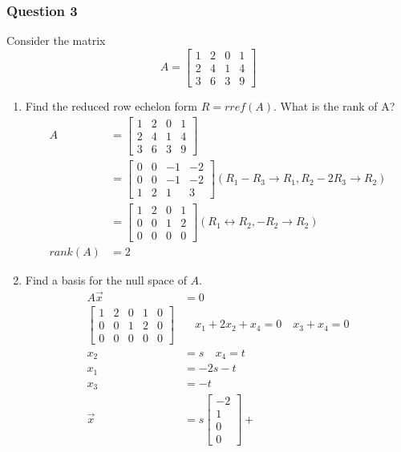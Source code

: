\documentclass{math}
\begin{document}
\subsubsection*{Question 3}
Consider the matrix
\[ A = \begin{bmatrix}
  1 & 2 & 0 & 1 \\
  2 & 4 & 1 & 4 \\
  3 & 6 & 3 & 9
\end{bmatrix} \]
\begin{enumerate}
  \item Find the reduced row echelon form \( R = rref(A) \). What is the rank
    of A?
  \begin{align*}
    A &= \begin{bmatrix}
      1 & 2 & 0 & 1 \\
      2 & 4 & 1 & 4 \\
      3 & 6 & 3 & 9
    \end{bmatrix} \\
    &= \begin{bmatrix}
      0 & 0 & -1 & -2 \\
      0 & 0 & -1 & -2 \\
      1 & 2 & 1 & 3
    \end{bmatrix} (R_1-R_3 \to R_1, R_2-2R_3 \to R_2) \\
    &= \begin{bmatrix}
      1 & 2 & 0 & 1 \\
      0 & 0 & 1 & 2 \\
      0 & 0 & 0 & 0
    \end{bmatrix} (R_1 \leftrightarrow R_2, -R_2 \to R_2) \\
    rank(A) &= 2
  \end{align*}
  \item Find a basis for the null space of \( A \).
  \begin{align*}
    A\vec{x} &= 0 \\
    \begin{bmatrix}
      1 & 2 & 0 & 1 & 0 \\
      0 & 0 & 1 & 2 & 0 \\
      0 & 0 & 0 & 0 & 0
    \end{bmatrix} &\quad x_1+2x_2+x_4 = 0 \quad x_3+x_4 = 0 \\
    x_2 &= s \quad x_4 = t \\
    x_1 &= -2s-t \\
    x_3 &= -t \\
    \vec{x} &= s\begin{bmatrix}-2 \\ 1 \\ 0 \\ 0\end{bmatrix}+

\end{align*}
\end{enumerate}
\end{document}
